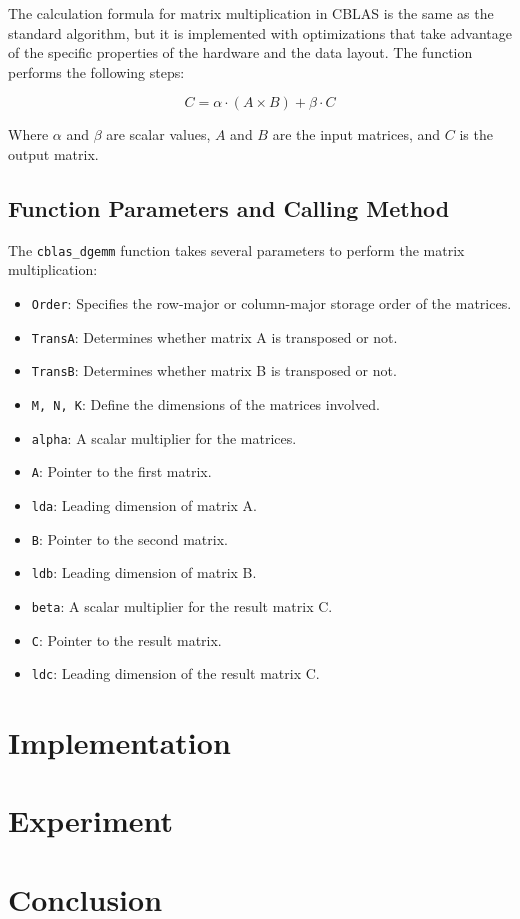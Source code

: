 \documentclass{article}
\begin{document}
The calculation formula for matrix multiplication in CBLAS is the same as the standard algorithm, but it is implemented with optimizations that take advantage of the specific properties of the hardware and the data layout. The function performs the following steps:

\[
C = \alpha \cdot (A \times B) + \beta \cdot C
\]

Where $\alpha$ and $\beta$ are scalar values, $A$ and $B$ are the input matrices, and $C$ is the output matrix.

\subsection{Function Parameters and Calling Method}
The \texttt{cblas\_dgemm} function takes several parameters to perform the matrix multiplication:

\begin{itemize}
  \item \texttt{Order}: Specifies the row-major or column-major storage order of the matrices.
  \item \texttt{TransA}: Determines whether matrix A is transposed or not.
  \item \texttt{TransB}: Determines whether matrix B is transposed or not.
  \item \texttt{M, N, K}: Define the dimensions of the matrices involved.
  \item \texttt{alpha}: A scalar multiplier for the matrices.
  \item \texttt{A}: Pointer to the first matrix.
  \item \texttt{lda}: Leading dimension of matrix A.
  \item \texttt{B}: Pointer to the second matrix.
  \item \texttt{ldb}: Leading dimension of matrix B.
  \item \texttt{beta}: A scalar multiplier for the result matrix C.
  \item \texttt{C}: Pointer to the result matrix.
  \item \texttt{ldc}: Leading dimension of the result matrix C.
\end{itemize}

\section{Implementation}\label{sec::c_implementation}

\section{Experiment}\label{sec::experiment}

\section{Conclusion}\label{sec::conclusion}

  
  
\end{document}
